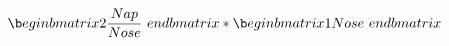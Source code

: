\documentclass[preview]{standalone}
\begin{document}
\begin{align*}
\b e gin{bmatrix}   2   \frac{ N ap}{ N o s e }   \ e nd{bmatrix}   *   \b e gin{bmatrix}   1   N o s e   \ e nd{bmatrix}
\end{align*}
\end{document}
